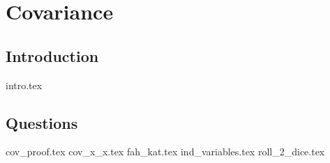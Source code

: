 \documentclass{exam}
\begin{document}
\section{Covariance}
\subsection{Introduction}
{intro.tex}
\subsection{Questions}
\begin{questions}
{cov_proof.tex}
{cov_x_x.tex}
{fah_kat.tex}
{ind_variables.tex}
{roll_2_dice.tex}
\end{questions}

\begin{comment}
\section{Linear Least Squares Estimator}
{intro.tex}
\subsection{Questions}
\begin{questions}
{find_L.tex}
{find_from_graph.tex}
\end{questions}
\end{comment}
\end{document}
